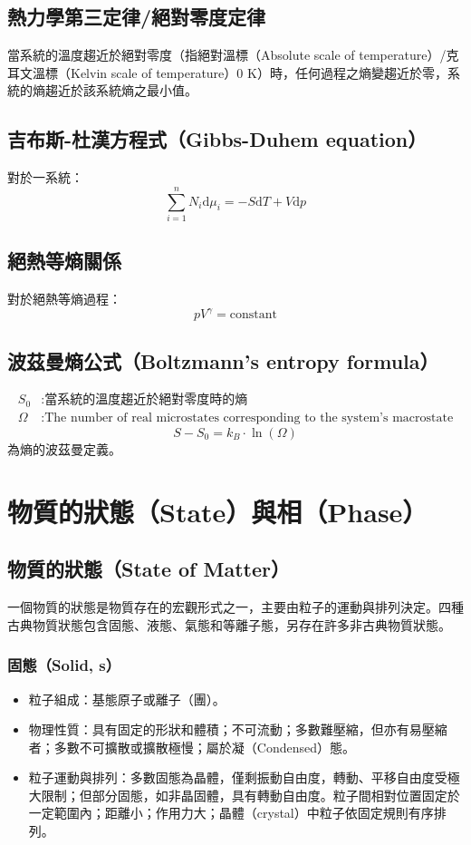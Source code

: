 \documentclass[a4paper,12pt]{report}
\begin{document}
\subsection{熱力學第三定律/絕對零度定律}
當系統的溫度趨近於絕對零度（指絕對溫標（Absolute scale of temperature）/克耳文溫標（Kelvin scale of temperature）$0$ K）時，任何過程之熵變趨近於零，系統的熵趨近於該系統熵之最小值。
\subsection{吉布斯-杜漢方程式（Gibbs-Duhem equation）}
對於一系統：
\[\displaystyle \sum _{i=1}^{n}N_{i}\mathrm {d} \mu _{i}=-S\mathrm {d} T+V\mathrm {d} p\]
\subsection{絕熱等熵關係}
對於絕熱等熵過程：
\[pV^{\gamma}=\text{constant}\]
\subsection{波茲曼熵公式（Boltzmann's entropy formula）}
\[\begin{aligned}
S_0&: \text{當系統的溫度趨近於絕對零度時的熵}\\
\Omega&: \text{The number of real microstates corresponding to the system's macrostate}
\end{aligned}\]
\[S-S_0 = k_B \cdot \ln(\Omega)\]
為熵的波茲曼定義。


\section{物質的狀態（State）與相（Phase）}
\subsection{物質的狀態（State of Matter）}
一個物質的狀態是物質存在的宏觀形式之一，主要由粒子的運動與排列決定。四種古典物質狀態包含固態、液態、氣態和等離子態，另存在許多非古典物質狀態。
\subsubsection{固態（Solid, s）}
\begin{itemize}
\item 粒子組成：基態原子或離子（團）。
\item 物理性質：具有固定的形狀和體積；不可流動；多數難壓縮，但亦有易壓縮者；多數不可擴散或擴散極慢；屬於凝（Condensed）態。
\item 粒子運動與排列：多數固態為晶體，僅剩振動自由度，轉動、平移自由度受極大限制；但部分固態，如非晶固體，具有轉動自由度。粒子間相對位置固定於一定範圍內；距離小；作用力大；晶體（crystal）中粒子依固定規則有序排列。
\end{itemize}
\end{document}
